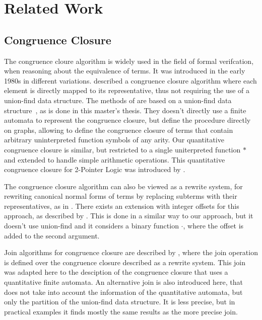 \chapter{Related Work}


\section{Congruence Closure}

The congruence cloure algorithm is widely used in the field of formal verifcation,
when reasoning about the equivalence of terms. It was introduced in the early 1980s
in different variations. \textcite{cc-tarjan} described a congruence closure algorithm
where each element is directly mapped to its representative, thus not requiring the
use of a union-find data structure.
The methods of \textcite{cc-nelson,cc-shostak} are based on a union-find data structure~\cite{uf-tarjan}, as
is done in this master's thesis. They doesn't directly use a finite automata to represent
the congruence closure, but define the procedure directly on graphs,
allowing to define the congruence closure of terms that contain arbitrary uninterpreted function symbols
of any arity.
Our quantitative congruence closure is similar, but restricted to a single uniterpreted function $*$
and extended to handle simple arithmetic operations.
This quantitative congruence closure for 2-Pointer Logic was introduced by \textcite{2pointer}.

The congruence closure algorithm can also be viewed as a rewrite system,
for rewriting canonical normal forms of terms by replacing subterms with their representatives,
as in \cite{cc-kapur,abstract-cc}.
There exists an extension with integer offsets for this approach, as described by \textcite{cc-offsets}.
This is done in a similar way to our approach, but it doesn't use union-find and it considers a
binary function $\cdot$, where the offset is added to the second argument.

Join algorithms for congruence closure are described by \textcite{join},
where the join operation is defined over the congruence closure described
as a rewrite system.
This join was adapted here to the desciption of the congruence closure that uses a quantitative finite automata.
An alternative join is also introduced here, that does not take into account the information of the
quantitative automata, but only the partition of the union-find data structure.
It is less precise, but in practical examples it finds mostly the same results as the more precise join.


